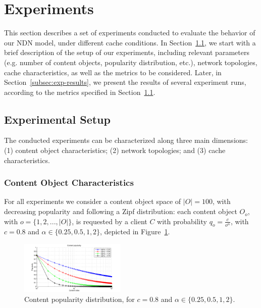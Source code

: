 \section{Experiments}
\label{sec:experiments}

This section describes a set of experiments conducted to evaluate 
the behavior of our NDN model, under different cache conditions. In 
Section~\ref{subsec:exp-setup}, we start 
with a brief description of the setup of our experiments, 
including relevant parameters (e.g. number of content objects, popularity 
distribution, etc.), network topologies, cache characteristics, as well as the 
metrics to be considered. Later, in Section~\ref{subsec:exp-results}, we 
present the results of several experiment runs, according to the metrics 
specified in Section~\ref{subsec:exp-setup}.

\subsection{Experimental Setup}
\label{subsec:exp-setup}

The conducted experiments can be characterized along three main dimensions: (1) 
content object characteristics; (2) network topologies; and (3) cache 
characteristics.\shortvertbreak

\subsubsection{Content Object Characteristics}
\label{subsec:exp-setup-cobj}

For all experiments we consider a content object space of 
$|O| = 100$, with decreasing popularity and following a Zipf distribution: 
each content object $O_o$, with $o = \{1,2,...,|O|\}$, is requested by a client 
$C$ with probability $q_{o} = \frac{c}{o^{\alpha}}$, with $c = 0.8$ and 
$\alpha \in \{0.25, 0.5, 1, 2\}$, depicted in Figure~\ref{fig:zipf}.\shortvertbreak

\begin{figure}[h!]

    \centering
    \includegraphics[width=0.45\textwidth]{figures/pop.pdf}
    \cprotect\caption{Content popularity distribution, for $c = 0.8$ and 
        $\alpha \in \{0.25, 0.5, 1, 2\}$.}
    \label{fig:zipf}

\end{figure}

